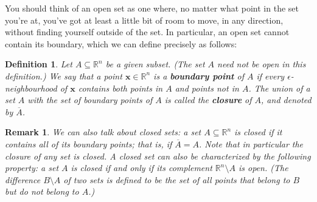 \documentclass[12pt,letterpaper]{article}
\newtheorem{rem}[theorem]{Remark}
\newenvironment{remark}{\begin{rem}\rm}{\end{rem}}
\newtheorem{definition}[theorem]{Definition}
\newcommand{\R}{\mathbb{R}}
\newcommand{\x}{\mathbf{x}}
\begin{document}
You should think of an open set as one where, no matter what point in the set you're at, you've got at least a little bit of room to move, in any direction, without finding yourself outside of the set. In particular, an open set cannot contain its boundary, which we can define precisely as follows:
\begin{definition}
Let $A\subseteq \R^n$ be a given subset. (The set $A$ need not be open in this definition.) We say that a point $\x\in\R^n$ is a {\bf boundary point} of $A$ if every $\epsilon$-neighbourhood of $\x$ contains both points in $A$ and points not in $A$. The union of a set $A$ with the set of boundary points of $A$ is called the {\bf closure} of $A$, and denoted by $\overline{A}$.
\end{definition}
\begin{remark}
We can also talk about {\em closed} sets: a set $A\subseteq\R^n$ is closed if it contains all of its boundary points; that is, if $\overline{A}=A$. Note that in particular the closure of any set is closed. A closed set can also be characterized by the following property: a set $A$ is closed if and only if its complement $\R^n\setminus A$ is open. (The difference $B\setminus A$ of two sets is defined to be the set of all points that belong to $B$ but do not belong to $A$.)
\end{remark}
\end{document}
